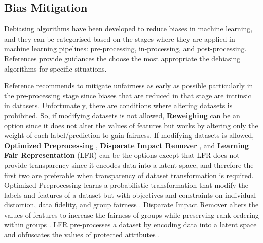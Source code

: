 \documentclass[sigconf,review]{acmart}
\begin{document}
	
	\subsection{Bias Mitigation}
	\label{sec:bias_mitigation}
	
	Debiasing algorithms have been developed to reduce biases in machine learning, and they can be categorised based on the stages where they are applied in machine learning pipelines: pre-processing, in-processing, and post-processing. References \cite{mahoney2020ai,ibmaif3602022guidance} provide guidances the choose the most appropriate the debiasing algorithms for specific situations.
	
	Reference \cite{mahoney2020ai} recommends to mitigate unfairness as early as possible particularly in the pre-processing stage since biases that are reduced in that stage are intrinsic in datasets. Unfortunately, there are conditions where altering datasets is prohibited. So, if modifying datasets is not allowed, \textbf{Reweighing} \cite{kamiran2011reweighing} can be an option since it does not alter the values of features but works by altering only the weight of each label/prediction to gain fairness. If modifying datasets is allowed, \textbf{Optimized Preprocessing} \cite{calmon2017optimized}, \textbf{Disparate Impact Remover} \cite{feldman2015disparate}, and \textbf{Learning Fair Representation} (LFR) \cite{zemel2013lfr} can be the options except that LFR does not provide transparency since it encodes data into a latent space, and therefore the first two are preferable when transparency of dataset transformation is required.
	Optimized Preprocessing learns a probabilistic transformation that modify the labels and features of a dataset but with objectives and constraints on individual distortion, data fidelity, and group fairness \cite{mahoney2020ai,calmon2017optimized}.
	Disparate Impact Remover alters the values of features to increase the fairness of groups while preserving rank-ordering within groups \cite{mahoney2020ai,feldman2015disparate}.
	LFR pre-processes a dataset by encoding data into a latent space and obfuscates the values of protected attributes \cite{mahoney2020ai,zemel2013lfr}.
	
\end{document}

